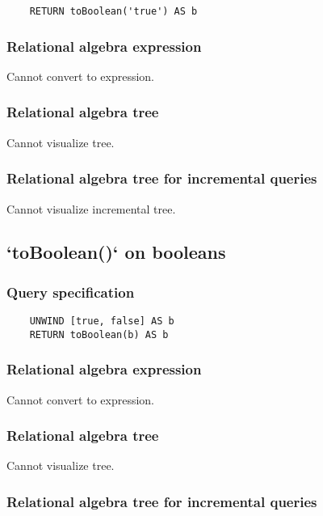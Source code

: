 	\begin{lstlisting}
	RETURN toBoolean('true') AS b
	\end{lstlisting}


	\subsubsection*{Relational algebra expression}

	Cannot convert to expression.

	\subsubsection*{Relational algebra tree}

	Cannot visualize tree.

	\subsubsection*{Relational algebra tree for incremental queries}

	Cannot visualize incremental tree.
	\subsection{`toBoolean()` on booleans}

	\subsubsection*{Query specification}

	\begin{lstlisting}
	UNWIND [true, false] AS b
	RETURN toBoolean(b) AS b
	\end{lstlisting}


	\subsubsection*{Relational algebra expression}

	Cannot convert to expression.

	\subsubsection*{Relational algebra tree}

	Cannot visualize tree.

	\subsubsection*{Relational algebra tree for incremental queries}

